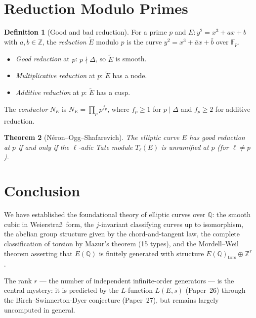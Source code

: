 \documentclass[12pt,a4paper]{amsart}
\newtheorem{theorem}{Theorem}[section]
\theoremstyle{definition}
\newtheorem{definition}[theorem]{Definition}
\newcommand{\Z}{\mathbb{Z}}
\newcommand{\Q}{\mathbb{Q}}
\newcommand{\Fp}{\mathbb{F}_p}
\begin{document}
\section{Reduction Modulo Primes}

\begin{definition}[Good and bad reduction]
\label{def:reduction}
For a prime $p$ and $E: y^2 = x^3 + ax + b$ with $a, b \in \Z$,
the \emph{reduction} $\tilde E$ modulo $p$ is the curve
$y^2 = x^3 + \bar a x + \bar b$ over $\Fp$.
\begin{itemize}
  \item \emph{Good reduction} at $p$: $p \nmid \Delta$, so $\tilde E$ is smooth.
  \item \emph{Multiplicative reduction} at $p$: $\tilde E$ has a node.
  \item \emph{Additive reduction} at $p$: $\tilde E$ has a cusp.
\end{itemize}
The \emph{conductor} $N_E$ is $N_E = \prod_p p^{f_p}$, where $f_p \ge 1$
for $p \mid \Delta$ and $f_p \ge 2$ for additive reduction.
\end{definition}

\begin{theorem}[N\'eron--Ogg--Shafarevich]
\label{thm:NOS}
The elliptic curve $E$ has good reduction at $p$ if and only if
the $\ell$-adic Tate module $T_\ell(E)$ is unramified at $p$
(for $\ell \ne p$).
\end{theorem}

\section{Conclusion}

We have established the foundational theory of elliptic curves over $\Q$:
the smooth cubic in Weierstra\ss\ form, the $j$-invariant classifying
curves up to isomorphism, the abelian group structure given by the
chord-and-tangent law, the complete classification of torsion by Mazur's
theorem (15 types), and the Mordell--Weil theorem asserting that $E(\Q)$
is finitely generated with structure $E(\Q)_{\mathrm{tors}} \oplus \Z^r$.

The rank $r$ --- the number of independent infinite-order generators ---
is the central mystery: it is predicted by the $L$-function $L(E,s)$
(Paper~26) through the Birch--Swinnerton-Dyer conjecture (Paper~27),
but remains largely uncomputed in general.
\end{document}
